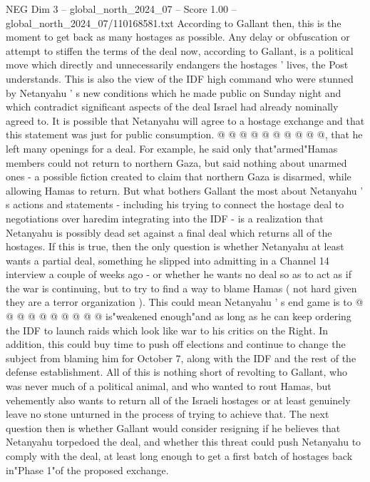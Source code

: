\begin{textsample}{NEG Dim 3 – global\_north\_2024\_07 – Score 1.00 – global\_north\_2024\_07/110168581.txt}
According to Gallant then, this is the moment to get back as many hostages as possible.
Any delay or obfuscation or attempt to stiffen the terms of the deal now, according to Gallant, is a political move which directly and unnecessarily endangers the hostages ' lives, the Post understands.
This is also the view of the IDF high command who were stunned by Netanyahu ' s new conditions which he made public on Sunday night and which contradict significant aspects of the deal Israel had already nominally agreed to.
It is possible that Netanyahu will agree to a hostage exchange and that this statement was just for public consumption. @ @ @ @ @ @ @ @ @ @, that he left many openings for a deal.
For example, he said only that"armed"Hamas members could not return to northern Gaza, but said nothing about unarmed ones - a possible fiction created to claim that northern Gaza is disarmed, while allowing Hamas to return.
But what bothers Gallant the most about Netanyahu ' s actions and statements - including his trying to connect the hostage deal to negotiations over haredim integrating into the IDF - is a realization that Netanyahu is possibly dead set against a final deal which returns all of the hostages.
If this is true, then the only question is whether Netanyahu at least wants a partial deal, something he slipped into admitting in a Channel 14 interview a couple of weeks ago - or whether he wants no deal so as to act as if the war is continuing, but to try to find a way to blame Hamas ( not hard given they are a terror organization ).
This could mean Netanyahu ' s end game is to @ @ @ @ @ @ @ @ @ @ is"weakened enough"and as long as he can keep ordering the IDF to launch raids which look like war to his critics on the Right.
In addition, this could buy time to push off elections and continue to change the subject from blaming him for October 7, along with the IDF and the rest of the defense establishment.
All of this is nothing short of revolting to Gallant, who was never much of a political animal, and who wanted to rout Hamas, but vehemently also wants to return all of the Israeli hostages or at least genuinely leave no stone unturned in the process of trying to achieve that.
The next question then is whether Gallant would consider resigning if he believes that Netanyahu torpedoed the deal, and whether this threat could push Netanyahu to comply with the deal, at least long enough to get a first batch of hostages back in"Phase 1"of the proposed exchange.

\end{textsample}

